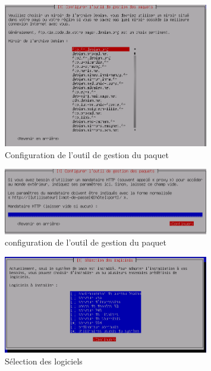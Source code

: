 \documentclass[11pt,a4paper,titlepage, oneside]{article}
\begin{document}
		\begin{figure}[htp]
                        \centering
                        \includegraphics[width=0.8\textwidth,natwidth=610,natheight=642]{images/debian18.png}
                        \caption{Configuration de l'outil de gestion du paquet}
		\end{figure}
		
			\begin{figure}[htp]
                        \centering
                        \includegraphics[width=0.8\textwidth,natwidth=610,natheight=642]{images/debian19.png}
                        \caption{configuration de l'outil de gestion du paquet}
		\end{figure}

		\begin{figure}[htp]
                        \centering
                        \includegraphics[width=0.8\textwidth,natwidth=610,natheight=642]{images/debian20.png}
                        \caption{Sélection des logiciels}
		\end{figure}
	
\end{document}
